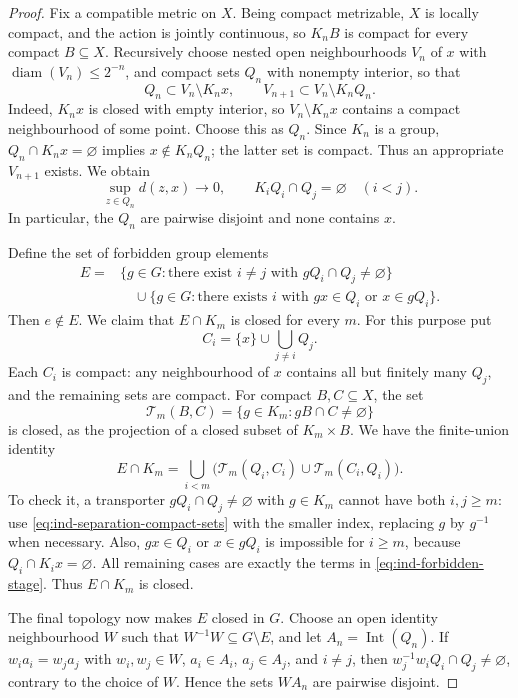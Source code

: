 \begin{proof}
Fix a compatible metric on $X$. Being compact metrizable, $X$ is locally
compact, and the action is jointly continuous, so $K_nB$ is compact for
every compact $B\subseteq X$. Recursively choose nested open
neighbourhoods $V_n$ of $x$ with $\operatorname{diam}(V_n)\le2^{-n}$,
and compact sets $Q_n$ with nonempty interior, so that
\begin{equation}\label{eq:ind-separation-recursion}
Q_n\subset V_n\setminus K_nx,\qquad
V_{n+1}\subset V_n\setminus K_nQ_n.
\end{equation}
Indeed, $K_nx$ is closed with empty interior, so
$V_n\setminus K_nx$ contains a compact neighbourhood of some point.
Choose this as $Q_n$. Since $K_n$ is a group,
$Q_n\cap K_nx=\varnothing$ implies $x\notin K_nQ_n$; the latter
set is compact. Thus an appropriate $V_{n+1}$ exists. We obtain
\begin{equation}\label{eq:ind-separation-compact-sets}
\sup_{z\in Q_n}d(z,x)\longrightarrow0,\qquad
K_iQ_i\cap Q_j=\varnothing\quad(i<j).
\end{equation}
In particular, the $Q_n$ are pairwise disjoint and none contains $x$.

Define the set of forbidden group elements
\begin{align*}
E={}&\{g\in G:\text{there exist }i\ne j\text{ with }gQ_i\cap Q_j\ne\varnothing\}\\
&\quad\cup\{g\in G:\text{there exists }i\text{ with }gx\in Q_i
                    \text{ or }x\in gQ_i\}.
\end{align*}
Then $e\notin E$. We claim that $E\cap K_m$ is closed for every $m$.
For this purpose put
\[
C_i=\{x\}\cup\bigcup_{j\ne i}Q_j.
\]
Each $C_i$ is compact: any neighbourhood of $x$ contains all but
finitely many $Q_j$, and the remaining sets are compact. For compact
$B,C\subseteq X$, the set
\[
\mathcal T_m(B,C)=\{g\in K_m:gB\cap C\ne\varnothing\}
\]
is closed, as the projection of a closed subset of $K_m\times B$.
We have the finite-union identity
\begin{equation}\label{eq:ind-forbidden-stage}
E\cap K_m=\bigcup_{i<m}
\bigl(\mathcal T_m(Q_i,C_i)\cup\mathcal T_m(C_i,Q_i)\bigr).
\end{equation}
To check it, a transporter $gQ_i\cap Q_j\ne\varnothing$ with
$g\in K_m$ cannot have both $i,j\ge m$: use
\eqref{eq:ind-separation-compact-sets} with the smaller index, replacing
$g$ by $g^{-1}$ when necessary. Also, $gx\in Q_i$ or $x\in gQ_i$
is impossible for $i\ge m$, because $Q_i\cap K_ix=\varnothing$.
All remaining cases are exactly the terms in
\eqref{eq:ind-forbidden-stage}. Thus $E\cap K_m$ is closed.

The final topology now makes $E$ closed in $G$. Choose an open
identity neighbourhood $W$ such that $W^{-1}W\subseteq G\setminus E$,
and let $A_n=\operatorname{Int}(Q_n)$. If $w_i a_i=w_j a_j$ with
$w_i,w_j\in W$, $a_i\in A_i$, $a_j\in A_j$, and $i\ne j$, then
$w_j^{-1}w_iQ_i\cap Q_j\ne\varnothing$, contrary to the choice of
$W$. Hence the sets $WA_n$ are pairwise disjoint.
\end{proof}

